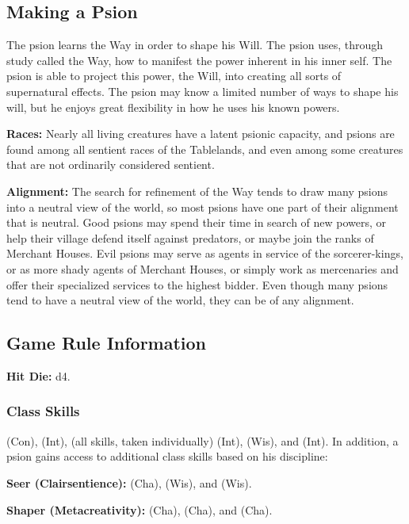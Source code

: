 
\subsection{Making a Psion}
The psion learns the Way in order to shape his Will. The psion uses, through study called the Way, how to manifest the power inherent in his inner self. The psion is able to project this power, the Will, into creating all sorts of supernatural effects. The psion may know a limited number of ways to shape his will, but he enjoys great flexibility in how he uses his known powers.

\textbf{Races:} Nearly all living creatures have a latent psionic capacity, and psions are found among all sentient races of the Tablelands, and even among some creatures that are not ordinarily considered sentient.

\textbf{Alignment:} The search for refinement of the Way tends to draw many psions into a neutral view of the world, so most psions have one part of their alignment that is neutral. Good psions may spend their time in search of new powers, or help their village defend itself against predators, or maybe join the ranks of Merchant Houses. Evil psions may serve as agents in service of the sorcerer-kings, or as more shady agents of Merchant Houses, or simply work as mercenaries and offer their specialized services to the highest bidder. Even though many psions tend to have a neutral view of the world, they can be of any alignment.

\subsection{Game Rule Information}

\textbf{Hit Die:} d4.

\subsubsection{Class Skills}

 (Con),  (Int),  (all skills, taken individually) (Int),  (Wis), and  (Int). In addition, a psion gains access to additional class skills based on his discipline:

\textbf{Seer (Clairsentience):}  (Cha),  (Wis), and  (Wis).

\textbf{Shaper (Metacreativity):}  (Cha),  (Cha), and  (Cha).

